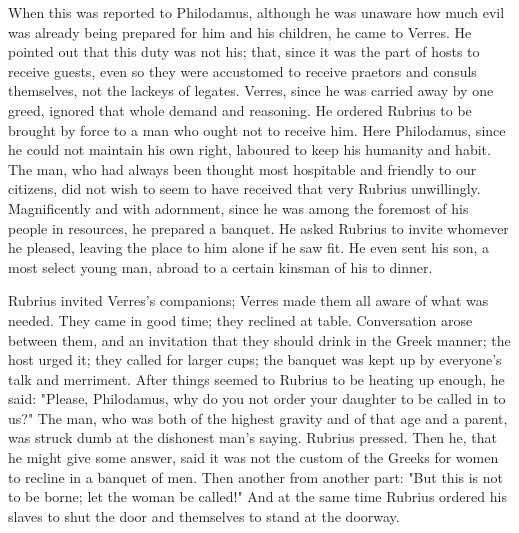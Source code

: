  When this was reported to Philodamus, although he was unaware how much evil was already being prepared for him and his children, he came to Verres. He pointed out that this duty was not his; that, since it was the part of hosts to receive guests, even so they were accustomed to receive praetors and consuls themselves, not the lackeys of legates. Verres, since he was carried away by one greed, ignored that whole demand and reasoning. He ordered Rubrius to be brought by force to a man who ought not to receive him. Here Philodamus, since he could not maintain his own right, laboured to keep his humanity and habit. The man, who had always been thought most hospitable and friendly to our citizens, did not wish to seem to have received that very Rubrius unwillingly. Magnificently and with adornment, since he was among the foremost of his people in resources, he prepared a banquet. He asked Rubrius to invite whomever he pleased, leaving the place to him alone if he saw fit. He even sent his son, a most select young man, abroad to a certain kinsman of his to dinner.

 Rubrius invited Verres's companions; Verres made them all aware of what was needed. They came in good time; they reclined at table. Conversation arose between them, and an invitation that they should drink in the Greek manner; the host urged it; they called for larger cups; the banquet was kept up by everyone's talk and merriment. After things seemed to Rubrius to be heating up enough, he said: "Please, Philodamus, why do you not order your daughter to be called in to us?" The man, who was both of the highest gravity and of that age and a parent, was struck dumb at the dishonest man's saying. Rubrius pressed. Then he, that he might give some answer, said it was not the custom of the Greeks for women to recline in a banquet of men. Then another from another part: "But this is not to be borne; let the woman be called!" And at the same time Rubrius ordered his slaves to shut the door and themselves to stand at the doorway.

